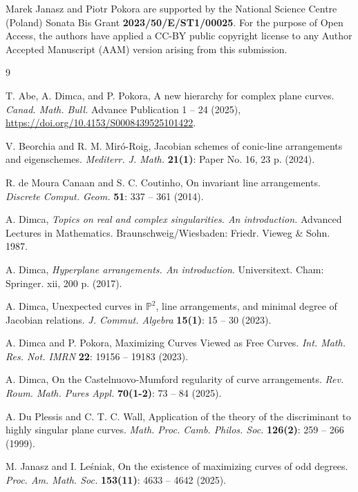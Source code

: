 \documentclass[11pt]{article}
\theoremstyle{plain}
\theoremstyle{definition}
\theoremstyle{remark}
\begin{document}
Marek Janasz and Piotr Pokora are supported by the National Science Centre (Poland) Sonata Bis Grant  \textbf{2023/50/E/ST1/00025}. For the purpose of Open Access, the authors have applied a CC-BY public copyright license to any Author Accepted Manuscript (AAM) version arising from this submission.
\begin{thebibliography}{9}

  T. Abe, A. Dimca, and P. Pokora, A new hierarchy for complex plane curves. \textit{Canad. Math. Bull.} Advance Publication 1 -- 24 (2025), \url{https://doi.org/10.4153/S0008439525101422}.

V. Beorchia and R. M. Mir\'o-Roig, Jacobian schemes of conic-line arrangements and eigenschemes.
\textit{Mediterr. J. Math.} \textbf{21(1)}: Paper No. 16, 23 p. (2024).

R. de Moura Canaan and S. C. Coutinho, On invariant line arrangements. \textit{Discrete Comput. Geom.} \textbf{51}: 337 -- 361 (2014).

A. Dimca,  \textit{Topics on real and complex singularities. An introduction.} Advanced Lectures in Mathematics. Braunschweig/Wiesbaden: Friedr. Vieweg \& Sohn. 1987.

A. Dimca,  \textit{Hyperplane arrangements. An introduction}. Universitext. Cham: Springer. xii, 200 p. (2017).

A. Dimca, Unexpected curves in $\mathbb{P}^{2}$, line arrangements, and minimal degree of Jacobian relations. \textit{J. Commut. Algebra} \textbf{15(1)}: 15 -- 30 (2023).

A. Dimca and P. Pokora, Maximizing Curves Viewed as Free Curves. \textit{Int. Math. Res. Not. IMRN} \textbf{22}:  19156 -- 19183 (2023).

A. Dimca, On the Castelnuovo-Mumford regularity of curve arrangements. \textit{Rev. Roum. Math. Pures Appl.} \textbf{70(1-2)}: 73 -- 84 (2025).

A. Du Plessis and C. T. C. Wall, Application of the theory of the discriminant to highly singular plane curves. \textit{Math. Proc. Camb. Philos. Soc.} \textbf{126(2)}: 259 -- 266 (1999).

 M. Janasz and I. Le\'sniak, On the existence of maximizing curves of odd degrees. \textit{Proc. Am. Math. Soc.} \textbf{153(11)}: 4633 -- 4642 (2025).


\end{thebibliography}
\end{document}
